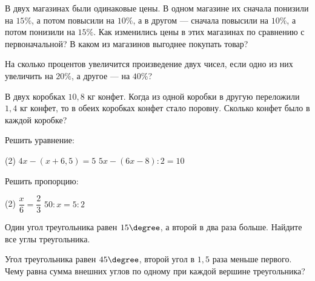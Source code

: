 \begin{homework}[number=3]
	\begin{listofex}
		\item В двух магазинах были одинаковые цены. В одном магазине их сначала понизили на \(15\%\), а потом повысили на \(10\%\), а в другом --- сначала повысили на \(10\%\), а потом понизили на \(15\%\). Как изменились цены в этих магазинах по сравнению с первоначальной? В каком из магазинов выгоднее покупать товар?
		\item На сколько процентов увеличится произведение двух чисел, если одно из них увеличить на \(20\%\), а другое --- на \( 40\% \)?
		\item В двух коробках \(10,8\) кг конфет. Когда из одной коробки в другую переложили \(1,4\) кг конфет, то в обеих коробках конфет стало поровну. Сколько конфет было в каждой коробке?
		\item Решить уравнение:
		\begin{tasks}(2)
			\task \( 4x-(x+6,5)=5 \)
			\task \( 5x - (6x-8):2 = 10 \)
		\end{tasks}
		\item Решить пропорцию:
		\begin{tasks}(2)
			\task \( \dfrac{x}{6}=\dfrac{2}{3} \)
			\task \( 50:x=5:2\)
		\end{tasks}
		\item Один угол треугольника равен \( 15\degree \), а второй в два раза больше. Найдите все углы треугольника.
		\item Угол треугольника равен \( 45\degree \), второй угол в \( 1,5 \) раза меньше первого. Чему равна сумма внешних углов по одному при каждой вершине треугольника?
	\end{listofex}
\end{homework}

